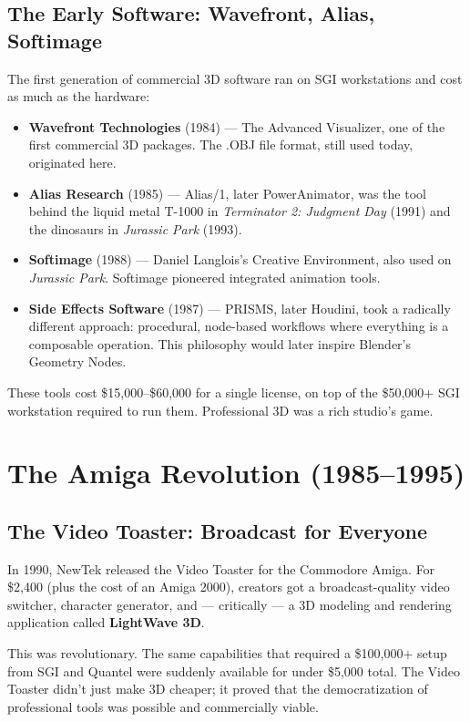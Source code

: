 \documentclass[11pt,letterpaper,twoside,openright]{book}
\begin{document}
\subsection{The Early Software: Wavefront, Alias, Softimage}

The first generation of commercial 3D software ran on SGI workstations and cost as much as the hardware:

\begin{itemize}[leftmargin=2em]
  \item \textbf{Wavefront Technologies} (1984) --- The Advanced Visualizer, one of the first commercial 3D packages. The .OBJ file format, still used today, originated here.
  \item \textbf{Alias Research} (1985) --- Alias/1, later PowerAnimator, was the tool behind the liquid metal T-1000 in \textit{Terminator 2: Judgment Day} (1991) and the dinosaurs in \textit{Jurassic Park} (1993).
  \item \textbf{Softimage} (1988) --- Daniel Langlois's Creative Environment, also used on \textit{Jurassic Park}. Softimage pioneered integrated animation tools.
  \item \textbf{Side Effects Software} (1987) --- PRISMS, later Houdini, took a radically different approach: procedural, node-based workflows where everything is a composable operation. This philosophy would later inspire Blender's Geometry Nodes.
\end{itemize}

These tools cost \$15,000--\$60,000 for a single license, on top of the \$50,000+ SGI workstation required to run them. Professional 3D was a rich studio's game.

\section{The Amiga Revolution (1985--1995)}
\label{sec:amiga}

\subsection{The Video Toaster: Broadcast for Everyone}

In 1990, NewTek released the Video Toaster for the Commodore Amiga. For \$2,400 (plus the cost of an Amiga 2000), creators got a broadcast-quality video switcher, character generator, and --- critically --- a 3D modeling and rendering application called \textbf{LightWave 3D}.

This was revolutionary. The same capabilities that required a \$100,000+ setup from SGI and Quantel were suddenly available for under \$5,000 total. The Video Toaster didn't just make 3D cheaper; it proved that the democratization of professional tools was possible and commercially viable.
\end{document}
